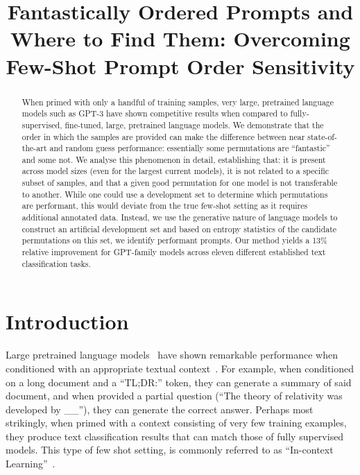 \title{Fantastically Ordered Prompts and Where to Find Them: Overcoming Few-Shot Prompt Order Sensitivity}

\begin{abstract}
When primed with only a handful of training samples, very large, pretrained language models such as GPT-3 have shown competitive results when compared to fully-supervised, fine-tuned, large, pretrained language models. We demonstrate that the order in which the samples are provided can make the difference between near state-of-the-art and random guess performance: essentially some permutations are ``fantastic'' and some not. We analyse this phenomenon in detail, establishing that: it is present across model sizes (even for the largest current models), it is not related to a specific subset of samples, and that a given good permutation for one model is not transferable to another. While one could use a development set to determine which permutations are performant, this would deviate from the true few-shot setting as it requires additional annotated data. Instead, we use the generative nature of language models to construct an artificial development set and based on entropy statistics of the candidate permutations on this set, we identify performant prompts. Our method yields a 13\% relative improvement for GPT-family models across eleven different established text classification tasks.
\end{abstract}

\section{Introduction}

Large pretrained language models~\cite[PLMs,][]{devlin2019bert,peters2018deep,raffel2020exploring,liu2019roberta,yang2019xlnet,Radford2019LanguageMA} have shown remarkable performance when conditioned with an appropriate textual context~\cite{petroni-etal-2019-language,petroni2020context,jiang2020can, shin2020autoprompt,davison2019commonsense}. For example, when conditioned on a long document and a ``TL;DR:'' token, they can generate a summary of said document, and when provided a partial question (``The theory of relativity was developed by \_\_''), they can generate the correct answer. Perhaps most strikingly, when primed with a context consisting of very few training examples, they produce text classification results that can match those of fully supervised models. This type of few shot setting, is commonly referred to as ``In-context Learning''~\cite{brown2020language}.

